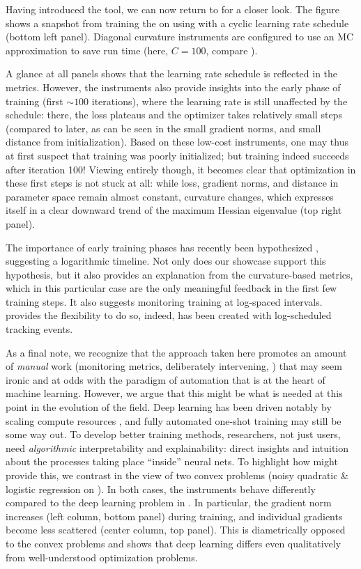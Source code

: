 Having introduced the tool, we can now return to 
for a closer look. The figure shows a snapshot from training the \allcnnc
\citep{springenberg2015striving} on \cifarhun using \sgd with a cyclic learning
rate schedule (bottom left panel). Diagonal curvature instruments are configured
to use an MC approximation to save run time (here, $C=100$, compare
).

A glance at all panels shows that the learning rate schedule is reflected in the
metrics. However, the instruments also provide insights into the early phase of
training (first $\sim100$ iterations), where the learning rate is still
unaffected by the schedule: there, the loss plateaus and the optimizer takes
relatively small steps (compared to later, as can be seen in the small gradient
norms, and small distance from initialization). Based on these low-cost
instruments, one may thus at first suspect that training was poorly initialized;
but training indeed succeeds after iteration 100! Viewing \cockpit entirely
though, it becomes clear that optimization in these first steps is not stuck at
all: while loss, gradient norms, and distance in parameter space remain almost
constant, curvature changes, which expresses itself in a clear downward trend of
the maximum Hessian eigenvalue (top right panel).

The importance of early training phases has recently been hypothesized
\citep{frankle2020early}, suggesting a logarithmic timeline. Not only does our
showcase support this hypothesis, but it also provides an explanation from the
curvature-based metrics, which in this particular case are the only meaningful
feedback in the first few training steps. It also suggests monitoring training
at log-spaced intervals. \cockpit provides the flexibility to do so, indeed,
 has been created with log-scheduled tracking events.

As a final note, we recognize that the approach taken here promotes an amount of
\emph{manual} work (monitoring metrics, deliberately intervening, \etc) that may
seem ironic and at odds with the paradigm of automation that is at the heart of
machine learning. However, we argue that this might be what is needed at this
point in the evolution of the field. Deep learning has been driven notably by
scaling compute resources \citep{thompson2020computational}, and fully automated
one-shot training may still be some way out. To develop better training methods,
researchers, not just users, need \emph{algorithmic} interpretability and
explainability: direct insights and intuition about the processes taking place
``inside'' neural nets. To highlight how \cockpit might provide this, we
contrast in  the view of two convex \deepobs
problems (noisy quadratic \& logistic regression on \mnist). In both cases, the
instruments behave differently compared to the deep learning problem in
. In particular, the gradient norm increases (left
column, bottom panel) during training, and individual gradients become less
scattered (center column, top panel). This is diametrically opposed to the
convex problems and shows that deep learning differs even qualitatively from
well-understood optimization problems.

